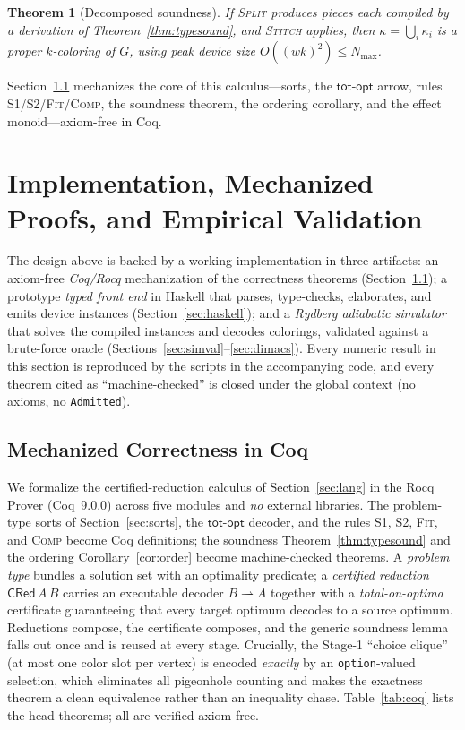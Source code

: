 \documentclass[11pt]{article}
\newtheorem{theorem}{Theorem}[section]
\theoremstyle{definition}
\theoremstyle{remark}
\newcommand{\Nmax}{N_{\max}}
\newcommand{\totopt}{\mathsf{tot\text{-}opt}}
\newcommand{\rn}[1]{\textsc{\footnotesize #1}}
\begin{document}
\begin{theorem}[Decomposed soundness]
\label{thm:decsound}
If \rn{Split} produces pieces each compiled by a derivation of
Theorem~\ref{thm:typesound}, and \rn{Stitch} applies, then
$\kappa=\bigcup_i\kappa_i$ is a proper $k$-coloring of $G$, using peak device size
$O((wk)^2)\le\Nmax$.
\end{theorem}

Section~\ref{sec:coq} mechanizes the core of this calculus---sorts, the $\totopt$
arrow, rules \rn{S1}/\rn{S2}/\rn{Fit}/\rn{Comp}, the soundness theorem, the
ordering corollary, and the effect monoid---axiom-free in Coq.

\section{Implementation, Mechanized Proofs, and Empirical Validation}
\label{sec:eval}

The design above is backed by a working implementation in three artifacts: an
axiom-free \emph{Coq/Rocq} mechanization of the correctness theorems
(Section~\ref{sec:coq}); a prototype \emph{typed front end} in Haskell that parses,
type-checks, elaborates, and emits device instances (Section~\ref{sec:haskell});
and a \emph{Rydberg adiabatic simulator} that solves the compiled instances and
decodes colorings, validated against a brute-force oracle
(Sections~\ref{sec:simval}--\ref{sec:dimacs}). Every numeric result in this section
is reproduced by the scripts in the accompanying code, and every theorem cited as
``machine-checked'' is closed under the global context (no axioms, no
\texttt{Admitted}).

\subsection{Mechanized Correctness in Coq}
\label{sec:coq}

We formalize the certified-reduction calculus of Section~\ref{sec:lang} in the Rocq
Prover (Coq~9.0.0) across five modules and \emph{no} external libraries. The
problem-type sorts of Section~\ref{sec:sorts}, the $\totopt$ decoder, and the rules
\rn{S1}, \rn{S2}, \rn{Fit}, and \rn{Comp} become Coq definitions; the soundness
Theorem~\ref{thm:typesound} and the ordering Corollary~\ref{cor:order} become
machine-checked theorems. A \emph{problem type} bundles a
solution set with an optimality predicate; a \emph{certified reduction}
$\mathsf{CRed}\,A\,B$ carries an executable decoder $B\rightharpoonup A$ together
with a \emph{total-on-optima} certificate guaranteeing that every target optimum
decodes to a source optimum. Reductions compose, the certificate composes, and the
generic soundness lemma falls out once and is reused at every stage. Crucially, the
Stage-1 ``choice clique'' (at most one color slot per vertex) is encoded
\emph{exactly} by an \texttt{option}-valued selection, which eliminates all
pigeonhole counting and makes the exactness theorem a clean equivalence rather than
an inequality chase. Table~\ref{tab:coq} lists the head theorems; all are verified
axiom-free.
\end{document}
